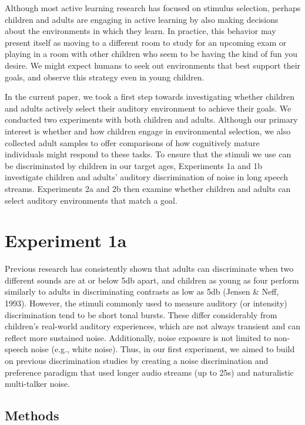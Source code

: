 \documentclass[10pt, letterpaper]{article}
\begin{document}
Although most active learning research has focused on stimulus
selection, perhaps children and adults are engaging in active learning
by also making decisions about the environments in which they learn. In
practice, this behavior may present itself as moving to a different room
to study for an upcoming exam or playing in a room with other children
who seem to be having the kind of fun you desire. We might expect humans
to seek out environments that best support their goals, and observe this
strategy even in young children.

In the current paper, we took a first step towards investigating whether
children and adults actively select their auditory environment to
achieve their goals. We conducted two experiments with both children and
adults. Although our primary interest is whether and how children engage
in environmental selection, we also collected adult samples to offer
comparisons of how cognitively mature individuals might respond to these
tasks. To ensure that the stimuli we use can be discriminated by
children in our target ages, Experiments 1a and 1b investigate children
and adults' auditory discrimination of noise in long speech streams.
Experiments 2a and 2b then examine whether children and adults can
select auditory environments that match a goal.

\hypertarget{experiment-1a}{%
\section{Experiment 1a}\label{experiment-1a}}

Previous research has consistently shown that adults can discriminate
when two different sounds are at or below 5db apart, and children as
young as four perform similarly to adults in discriminating contrasts as
low as 5db (Jensen \& Neff, 1993). However, the stimuli commonly used to
measure auditory (or intensity) discrimination tend to be short tonal
bursts. These differ considerably from children's real-world auditory
experiences, which are not always transient and can reflect more
sustained noise. Additionally, noise exposure is not limited to
non-speech noise (e.g., white noise). Thus, in our first experiment, we
aimed to build on previous discrimination studies by creating a noise
discrimination and preference paradigm that used longer audio streams
(up to 25s) and naturalistic multi-talker noise.

\hypertarget{methods}{%
\subsection{Methods}\label{methods}}
\end{document}
